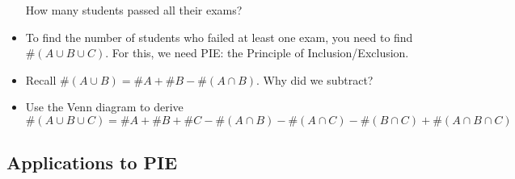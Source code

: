 \begin{itemize}
How many students passed all their exams?

\item To find the number of students who failed at least one exam, you need to find \\$\#(A \cup B \cup C)$.  For this, we need PIE: the Principle of Inclusion/Exclusion.

\item Recall $\#(A \cup B) = \#A + \#B - \#(A \cap B)$.  Why did we subtract?

\item Use the Venn diagram to derive 
\[\#(A \cup B \cup C) = \#A + \#B +\#C - \#(A \cap B) - \#(A \cap C) - \#(B \cap C) + \#(A \cap B \cap C)\]


\end{itemize}



\subsection*{Applications to PIE}

